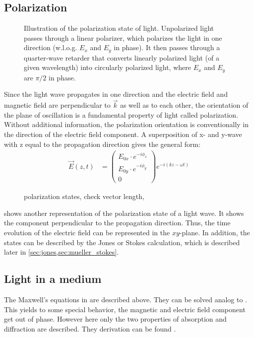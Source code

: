 \subsection{Polarization}
% 
\begin{figure}[!t]
\centering
\setlength{\tikzwidth}{\textwidth}
\label{fig:polarization_state}
\caption{Illustration of the polarization state of light. Unpolarized light passes through a linear polarizer, which polarizes the light in one direction (w.l.o.g. $E_x$ and $E_y$ in phase). It then passes through a quarter-wave retarder that converts linearly polarized light (of a given wavelength) into circularly polarized light, where $E_x$ and $E_y$ are $\pi/2$ in phase.}
\end{figure}
% 
Since the light wave propagates in one direction and the electric field and magnetic field are perpendicular to $\vec{k}$ as well as to each other, the orientation of the plane of oscillation is a fundamental property of light called polarization.
Without additional information, the polarization orientation is conventionally in the direction of the electric field component.
% 
A superposition of x- and y-wave with z equal to the propagation direction gives the general form:
\begin{align}
\vec{E}(z,t) &= \begin{pmatrix} E_{0x} \cdot e^{ -i \phi_x } \\ E_{0y} \cdot e^{ -i \phi_y } \\ 0 \end{pmatrix}
e^{ -i (kz - \omega t)}
\end{align}
%
\begin{figure}[!t]
\centering
\tikzset{external/export=false}

\caption{polarization states, check vector length,} 
\label{fig:polarization_state_vectors}
\end{figure}
%
 shows another representation of the polarization state of a light wave.
It shows the component perpendicular to the propagation direction.
Thus, the time evolution of the electric field can be represented in the $xy$-plane.
In addition, the states can be described by the Jones or Stokes calculation, which is described later in \cref{sec:jones,sec:mueller_stokes}.
% 
% 
% 
\subsection{Light in a medium}
% 
The Maxwell's equations in \dummy{} are described above. They can be solved analog to \dummy{}. This yields to some special behavior, \eg{} the magnetic and electric field component get out of phase.
However here only the two properties of absorption and diffraction are described.
They derivation can be found \eg{} \cite{demtroeder2, Fliebach2012}.
% 
